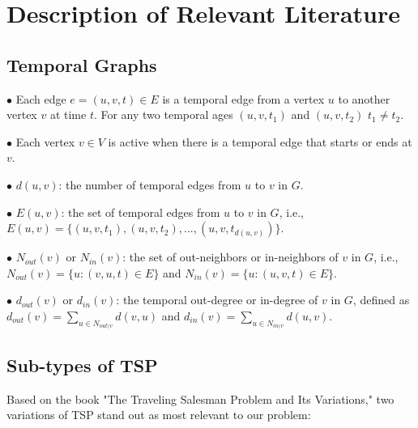 \section{Description of Relevant Literature}

\subsection{Temporal Graphs }

$\bullet$ \cite{doe2024temporal} Each edge $e = (u, v, t) \in E$ is a temporal edge from a vertex $u$ to another vertex $v$ at time $t$. For any two temporal ages $(u,v,t_1)$ and $(u,v,t_2)$ $t_1 \neq t_2$.

$\bullet$ Each vertex $v \in V$ is active when there is a temporal edge that starts or ends at $v$.

$\bullet$ $d(u, v)$: the number of temporal edges from $u$ to $v$ in $G$.

$\bullet$ $E(u, v)$: the set of temporal edges from $u$ to $v$ in $G$, i.e., $E(u,v)=\{(u,v,t_1),(u,v,t_2), ..., (u,v,t_{d(u,v)})\}$.

$\bullet$ $N_{out}(v)$ or $N_{in}(v)$: the set of out-neighbors or in-neighbors of $v$ in $G$, i.e., $N_{out}(v) = \{u : (v, u, t) ∈ E\}$ and $N_{in}(v) = \{u : (u, v, t) ∈ E\}$.

$\bullet$ $d_{out}(v)$ or $d_{in}(v)$: the temporal out-degree or in-degree of $v$ in $G$, defined as $d_{out}(v) = \sum_{u \in N_{out(v}} d(v,u)$ and $d_{in}(v) = \sum_{u \in N_{in(v}} d(u,v)$.

\subsection{Sub-types of TSP }
Based on the book "The Traveling Salesman Problem and Its Variations," \cite{gutin2007traveling} two variations of TSP stand out as most relevant to our problem:


